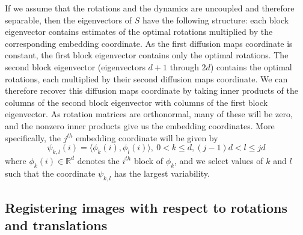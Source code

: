 \documentclass[12pt]{article}
\begin{document}
If we assume that the rotations and the dynamics are uncoupled and therefore separable, then the eigenvectors of $S$ have the following structure: each block eigenvector contains estimates of the optimal rotations multiplied by the corresponding embedding coordinate.
%
As the first diffusion maps coordinate is constant, the first block eigenvector contains only the optimal rotations.
%
The second block eigenvector (eigenvectors $d+1$ through $2d$) contains the optimal rotations, each multiplied by their second diffusion maps coordinate. 
%
We can therefore recover this diffusion maps coordinate by taking inner products of the columns of the second block eigenvector with columns of the first block eigenvector.
%
As rotation matrices are orthonormal, many of these will be zero, 
and the nonzero inner products give us the embedding coordinates.
%
More specifically, the $j^{th}$ embedding coordinate will be given by
\begin{equation} \label{eq:vdm_coord}
\psi_{k,l} (i) = \langle \phi_k(i), \phi_l(i) \rangle, \: 0 < k \le d, (j-1)d < l \le jd
\end{equation}
where $\phi_k(i) \in \mathbb{R}^d$ denotes the $i^{th}$ block of $\phi_k$, 
and we select values of $k$ and $l$ such that the coordinate $\psi_{k, l}$ has the largest variability. 
%

\subsection{Registering images with respect to rotations and translations} \label{subsec:trans_rot_register}
\end{document}
